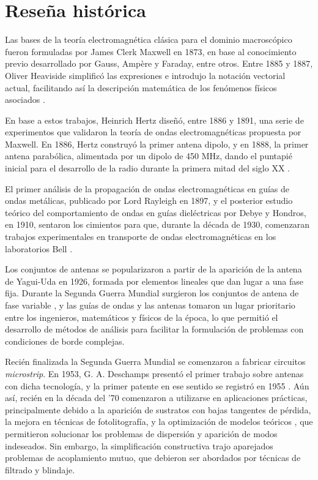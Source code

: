
\section{Reseña histórica}
\label{sec_intro_resenia}

Las bases de la teoría electromagnética clásica para el dominio macroscópico fueron formuladas por James Clerk Maxwell en 1873, en base al conocimiento previo desarrollado por Gauss, Ampère y Faraday, entre otros. Entre 1885 y 1887, Oliver Heaviside simplificó las expresiones e introdujo la notación vectorial actual, facilitando así la descripción matemática de los fenómenos físicos asociados \cite{Pozar:MwEngineering}.

En base a estos trabajos, Heinrich Hertz diseñó, entre 1886 y 1891, una serie de experimentos que validaron la teoría de ondas electromagnéticas propuesta por Maxwell. En 1886, Hertz construyó la primer antena dipolo, y en 1888, la primer antena parabólica, alimentada por un dipolo de 450 MHz, dando el puntapié inicial para el desarrollo de la radio durante la primera mitad del siglo \textsc{XX} \cite{Collin:GuidedWaves}.

El primer análisis de la propagación de ondas electromagnéticas en guías de ondas metálicas, publicado por Lord Rayleigh en 1897, y el posterior estudio teórico del comportamiento de ondas en guías dieléctricas por Debye y Hondros, en 1910, sentaron los cimientos para que, durante la década de 1930, comenzaran trabajos experimentales en transporte de ondas electromagnéticas en los laboratorios Bell \cite{Collin:GuidedWaves}.

Los conjuntos de antenas se popularizaron a partir de la aparición de la antena de Yagui-Uda en 1926, formada por elementos lineales que dan lugar a una fase fija. Durante la Segunda Guerra Mundial surgieron los conjuntos de antena de fase variable \cite{Stutzman:AntennaTheory}, y las guías de ondas y las antenas tomaron un lugar prioritario entre los ingenieros, matemáticos y físicos de la época, lo que permitió el desarrollo de métodos de análisis para facilitar la formulación de problemas con condiciones de borde complejas.

Recién finalizada la Segunda Guerra Mundial se comenzaron a fabricar circuitos \textit{microstrip}. En 1953, G. A. Deschamps presentó el primer trabajo sobre antenas con dicha tecnología, y la primer patente en ese sentido se registró en 1955 \cite{Balanis:Handbook}. Aún así, recién en la década del '70 comenzaron a utilizarse en aplicaciones prácticas, principalmente debido a la aparición de sustratos con bajas tangentes de pérdida, la mejora en técnicas de fotolitografía, y la optimización de modelos teóricos \cite{Barthia:Handbook}, que permitieron solucionar los problemas de dispersión y aparición de modos indeseados. Sin embargo, la simplificación constructiva trajo aparejados problemas de acoplamiento mutuo, que debieron ser abordados por técnicas de filtrado y blindaje.

